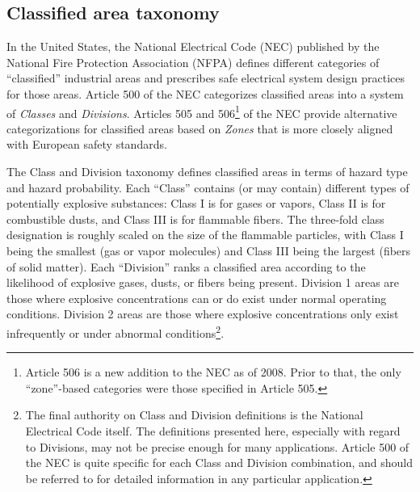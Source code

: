\filbreak
\subsection{Classified area taxonomy}

\label{classified_areas}

In the United States, the National Electrical Code (NEC) published by the National Fire Protection Association (NFPA) defines different categories of ``classified'' industrial areas and prescribes safe electrical system design practices for those areas.  Article 500 of the NEC categorizes classified areas into a system of \textit{Classes} and \textit{Divisions}.  Articles 505 and 506\footnote{Article 506 is a new addition to the NEC as of 2008.  Prior to that, the only ``zone''-based categories were those specified in Article 505.} of the NEC provide alternative categorizations for classified areas based on \textit{Zones} that is more closely aligned with European safety standards.      

The Class and Division taxonomy defines classified areas in terms of hazard type and hazard probability.  Each ``Class'' contains (or may contain) different types of potentially explosive substances: Class I is for gases or vapors, Class II is for combustible dusts, and Class III is for flammable fibers.  The three-fold class designation is roughly scaled on the size of the flammable particles, with Class I being the smallest (gas or vapor molecules) and Class III being the largest (fibers of solid matter).  Each ``Division'' ranks a classified area according to the likelihood of explosive gases, dusts, or fibers being present.  Division 1 areas are those where explosive concentrations can or do exist under normal operating conditions.  Division 2 areas are those where explosive concentrations only exist infrequently or under abnormal conditions\footnote{The final authority on Class and Division definitions is the National Electrical Code itself.  The definitions presented here, especially with regard to Divisions, may not be precise enough for many applications.  Article 500 of the NEC is quite specific for each Class and Division combination, and should be referred to for detailed information in any particular application.}.    

